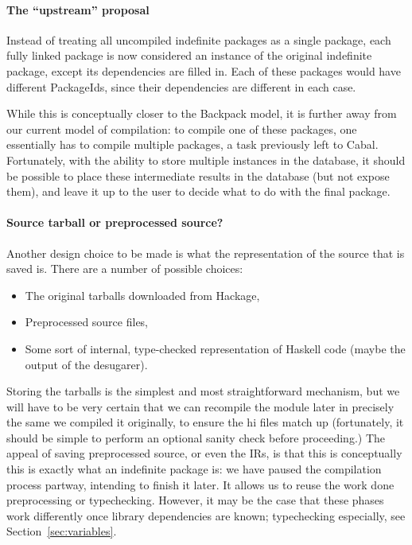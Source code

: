 \documentclass{article}
\begin{document}
\paragraph{The ``upstream'' proposal}  Instead of treating all
uncompiled indefinite packages as a single package, each fully linked
package is now considered an instance of the original indefinite
package, except its dependencies are filled in.  Each of these packages
would have different PackageIds, since their dependencies are different
in each case.

While this is conceptually closer to the Backpack model, it is further
away from our current model of compilation: to compile one of these packages,
one essentially has to compile multiple packages, a task previously left
to Cabal.  Fortunately, with the ability to store multiple instances in the database,
it should be possible to place these intermediate results in the database (but
not expose them), and leave it up to the user to decide what to do with the
final package.

\paragraph{Source tarball or preprocessed source?}  Another design choice
to be made is what the representation of the source that is saved is.  There
are a number of possible choices:

\begin{itemize}
    \item The original tarballs downloaded from Hackage,
    \item Preprocessed source files,
    \item Some sort of internal, type-checked representation of Haskell code (maybe the output of the desugarer).
\end{itemize}

Storing the tarballs is the simplest and most straightforward mechanism,
but we will have to be very certain that we can recompile the module
later in precisely the same we compiled it originally, to ensure the hi
files match up (fortunately, it should be simple to perform an optional
sanity check before proceeding.) The appeal of saving preprocessed
source, or even the IRs, is that this is conceptually this is exactly
what an indefinite package is: we have paused the compilation process
partway, intending to finish it later. It allows us to reuse the work
done preprocessing or typechecking.  However, it may be the case that
these phases work differently once library dependencies are known; typechecking
especially, see Section~\ref{sec:variables}.
\end{document}
